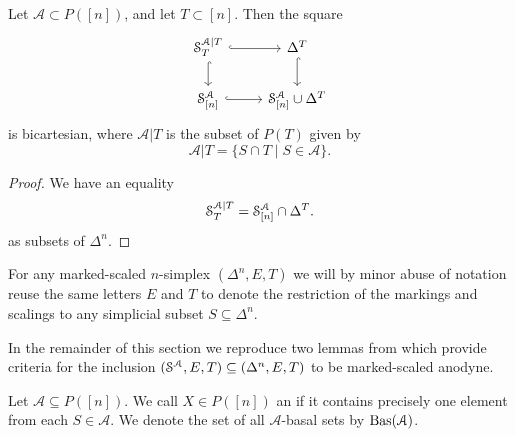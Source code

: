 \documentclass[main.tex]{subfiles}
\begin{document}
\begin{lemma}
  \label{lemma:bicartesian_square}
  Let $\mathcal{A} \subset P([n])$, and let $T \subset [n]$. Then the square
  \begin{equation*}
    \begin{tikzcd}
      \S^{\mathcal{A}|T}_{T}
      \arrow[r, hook]
      \arrow[d, hook]
      & \Delta^{T}
      \arrow[d, hook]
      \\
      \S^{\mathcal{A}}_{[n]}
      \arrow[r, hook]
      & \S^{\mathcal{A}}_{[n]} \cup \Delta^{T}
    \end{tikzcd}
  \end{equation*}
  is bicartesian, where $\mathcal{A}|T$ is the subset of $P(T)$ given by
  \begin{equation*}
    \mathcal{A}|T = \{S \cap T \mid S \in \mathcal{A}\}.
  \end{equation*}
\end{lemma}
\begin{proof}
  We have an equality
  \begin{equation*}
    \mathcal{S}_{T}^{\mathcal{A}|T} = \S^{\mathcal{A}}_{[n]} \cap \Delta^{T}.
  \end{equation*}
  as subsets of $\Delta^{n}$.
\end{proof}

\begin{notation}
  For any marked-scaled $n$-simplex $(\Delta^{n}, E, T)$ we will by minor abuse of notation reuse the same letters $E$ and $T$ to denote the restriction of the markings and scalings to any simplicial subset $S \subseteq \Delta^{n}$.
\end{notation}

In the remainder of this section we reproduce two lemmas from \cite{garcia2cartesianfibrationsii} which provide criteria for the inclusion $(\S^{\mathcal{A}}, E, T) \subseteq (\Delta^{n}, E, T)$ to be marked-scaled anodyne.

\begin{definition}
  Let $\mathcal{A} \subseteq P([n])$. We call $X \in P([n])$ an  if it contains precisely one element from each $S \in \mathcal{A}$. We denote the set of all $\mathcal{A}$-basal sets by $\Bas(\mathcal{A})$.
\end{definition}
\end{document}
